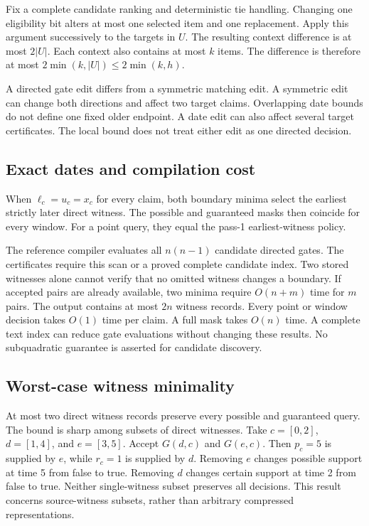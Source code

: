 Fix a complete candidate ranking and deterministic tie handling.
Changing one eligibility bit alters at most one selected item and one replacement.
Apply this argument successively to the targets in $U$.
The resulting context difference is at most $2|U|$.
Each context also contains at most $k$ items.
The difference is therefore at most $2\min(k,|U|)\leq2\min(k,h)$.

A directed gate edit differs from a symmetric matching edit.
A symmetric edit can change both directions and affect two target claims.
Overlapping date bounds do not define one fixed older endpoint.
A date edit can also affect several target certificates.
The local bound does not treat either edit as one directed decision.

\subsection{Exact dates and compilation cost}
When $\ell_c=u_c=x_c$ for every claim, both boundary minima select the earliest strictly later direct witness.
The possible and guaranteed masks then coincide for every window.
For a point query, they equal the pass-1 earliest-witness policy.

The reference compiler evaluates all $n(n-1)$ candidate directed gates.
The certificates require this scan or a proved complete candidate index.
Two stored witnesses alone cannot verify that no omitted witness changes a boundary.
If accepted pairs are already available, two minima require $O(n+m)$ time for $m$ pairs.
The output contains at most $2n$ witness records.
Every point or window decision takes $O(1)$ time per claim.
A full mask takes $O(n)$ time.
A complete text index can reduce gate evaluations without changing these results.
No subquadratic guarantee is asserted for candidate discovery.

\subsection{Worst-case witness minimality}
At most two direct witness records preserve every possible and guaranteed query.
The bound is sharp among subsets of direct witnesses.
Take $c=[0,2]$, $d=[1,4]$, and $e=[3,5]$.
Accept $G(d,c)$ and $G(e,c)$.
Then $p_c=5$ is supplied by $e$, while $r_c=1$ is supplied by $d$.
Removing $e$ changes possible support at time 5 from false to true.
Removing $d$ changes certain support at time 2 from false to true.
Neither single-witness subset preserves all decisions.
This result concerns source-witness subsets, rather than arbitrary compressed representations.
